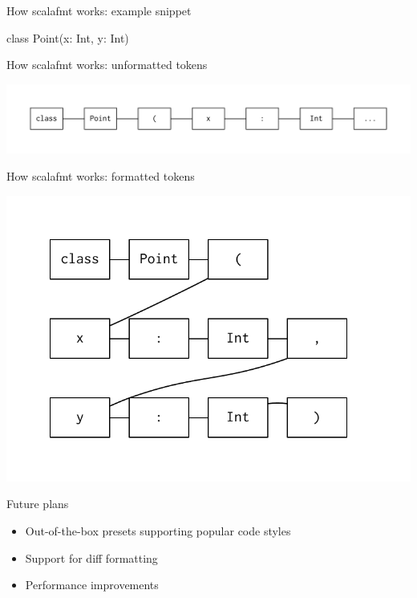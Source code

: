 \documentclass[svgnames,dvipsnames,hyperref={bookmarks=false},usepdftitle=false]{beamer}
\begin{document}
\begin{frame}{How scalafmt works: example snippet}
\begin{semiverbatim}
class Point(x: Int, y: Int)
\end{semiverbatim}
\end{frame}

\begin{frame}[c, fragile]{How scalafmt works: unformatted tokens}
\vskip20pt
\begin{center}
\includegraphics[width=0.9\linewidth]{tokens-raw.pdf}
\end{center}
\end{frame}

\begin{frame}[c, fragile]{How scalafmt works: formatted tokens}
\vskip20pt
\begin{center}
\includegraphics[width=0.9\linewidth]{tokens-formatted.pdf}
\end{center}
\end{frame}

\begin{frame}{Future plans}
\begin{itemize}
\item Out-of-the-box presets supporting popular code styles
\item Support for diff formatting
\item Performance improvements
\end{itemize}
\end{frame}
\end{document}
